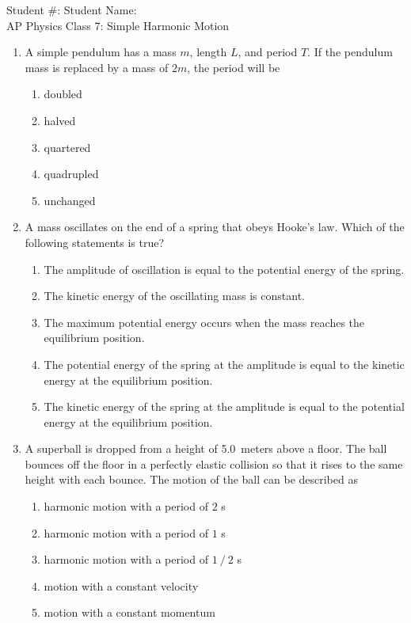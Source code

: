 \documentclass[12pt]{article}
\begin{document}
\begin{center}
  Student \#: \underline{\hspace{1in}}\hspace{1.9in}
  Student Name: \underline{\hspace{2in}}\\
  \vspace{0.3in}
  {\LARGE
    AP Physics \hspace{0.68in} Class 7: Simple Harmonic Motion
  }
\end{center}

\begin{enumerate}[leftmargin=50pt,label=\underline{\hspace{0.4in}} \arabic*.]

\item A simple pendulum has a mass $m$, length $L$, and period $T$. If the
  pendulum mass is replaced by a mass of $2m$, the period will be
  \begin{enumerate}[noitemsep,topsep=0pt]
  \item doubled
  \item halved
  \item quartered
  \item quadrupled
  \item unchanged
  \end{enumerate}

\item A mass oscillates on the end of a spring that obeys Hooke’s law. Which of
  the following statements is true?
  \begin{enumerate}[noitemsep,topsep=0pt]
  \item The amplitude of oscillation is equal to the potential energy of the
    spring.
  \item The kinetic energy of the oscillating mass is constant.
  \item The maximum potential energy occurs when the mass reaches the
    equilibrium position.
  \item The potential energy of the spring at the amplitude is equal to the
    kinetic energy at the equilibrium position.
  \item The kinetic energy of the spring at the amplitude is equal to the
    potential energy at the equilibrium position.
  \end{enumerate}

\item A superball is dropped from a height of \SI{5.0}{meters} above a floor.
  The ball bounces off the floor in a perfectly elastic collision so that it
  rises to the same height with each bounce. The motion of the ball can be
  described as
  \begin{enumerate}[noitemsep,topsep=0pt]
  \item harmonic motion with a period of $2$ \si{s}
  \item harmonic motion with a period of $1$ \si{s}
  \item harmonic motion with a period of $1⁄2$ \si{s}
  \item motion with a constant velocity
  \item motion with a constant momentum
  \end{enumerate}


\end{enumerate}
\end{document}
